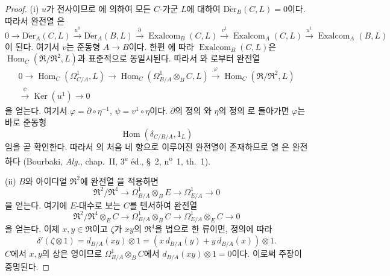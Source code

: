 \begin{proof}
(i) $u$가 전사이므로 에 의하여 모든
$C$-가군 $L$에 대하여
$\operatorname{D\acute{e}r}_B(C,L)=0$이다. 따라서 완전열
은
\begin{equation}
\tag{20.5.12.2}
\label{0.20.5.12.2-ko}
  0\longrightarrow\operatorname{D\acute{e}r}_A(C,L)
  \xrightarrow{u^0}\operatorname{D\acute{e}r}_A(B,L)
  \xrightarrow{\partial}\operatorname{Exalcom}_B(C,L)
  \xrightarrow{v^1}\operatorname{Exalcom}_A(C,L)
  \xrightarrow{u^1}\operatorname{Exalcom}_A(B,L)
\end{equation}
이 된다. 여기서 $v$는 준동형 $A\to B$이다. 한편
에 따라
$\operatorname{Exalcom}_B(C,L)$은
$\operatorname{Hom}_C(\mathfrak R/\mathfrak R^2,L)$과 표준적으로
동일시된다. 따라서 와
로부터 완전열
\begin{equation}
\tag{20.5.12.3}
\label{0.20.5.12.3-ko}
\begin{split}
  0\longrightarrow\operatorname{Hom}_C(\Omega^1_{C/A},L)
  \longrightarrow\operatorname{Hom}_C
    (\Omega^1_{B/A}\otimes_B C,L)
  \xrightarrow{\varphi}\operatorname{Hom}_C
    (\mathfrak R/\mathfrak R^2,L)\\
  \xrightarrow{\psi}\operatorname{Ker}(u^1)\longrightarrow0
\end{split}
\end{equation}
을 얻는다. 여기서
$\varphi=\partial\circ\eta^{-1}$,
$\psi=v^1\circ\eta$이다. $\partial$의 정의
와 $\eta$의 정의
로 돌아가면 $\varphi$는 바로 준동형
\[
  \operatorname{Hom}(\delta_{C/B/A},1_L)
\]
임을 곧 확인한다. 따라서 의 처음 네 항으로
이루어진 완전열이 존재하므로 열 은 완전하다
(Bourbaki, \emph{Alg.}, chap.~II, 3\textsuperscript{e} éd.,
\S~2, n\textsuperscript{o}~1, th.~1).

\medskip
(ii) $B$와 아이디얼 $\mathfrak R^2$에 완전열
을 적용하면
\begin{equation}
\tag{20.5.12.4}
\label{0.20.5.12.4-ko}
  \mathfrak R^2/\mathfrak R^4\longrightarrow
  \Omega^1_{B/A}\otimes_B E\longrightarrow
  \Omega^1_{E/A}\longrightarrow0
\end{equation}
을 얻는다. 여기에 $E$-대수로 보는 $C$를 텐서하여 완전열
\[
  \mathfrak R^2/\mathfrak R^4\otimes_E C\longrightarrow
  \Omega^1_{B/A}\otimes_B C\longrightarrow
  \Omega^1_{E/A}\otimes_E C\longrightarrow0
\]
을 얻는다. 이제 $x,y\in\mathfrak R$이고 $\zeta$가
$xy$의 $\mathfrak R^4$을 법으로 한 류이면, 정의에 따라
\[
  \delta'(\zeta\otimes1)
  =d_{B/A}(xy)\otimes1
  =(x\,d_{B/A}(y)+y\,d_{B/A}(x))\otimes1.
\]
$C$에서 $x,y$의 상은 영이므로
$\Omega^1_{B/A}\otimes_B C$에서
$d_{B/A}(xy)\otimes1=0$이다. 이로써 주장이 증명된다.


\end{proof}

